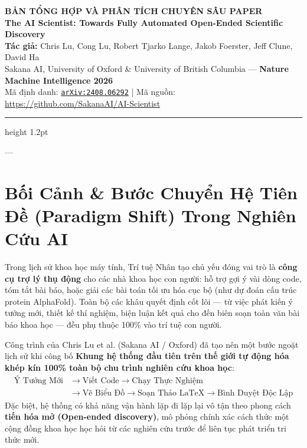 \documentclass[11pt,a4paper]{article}
\begin{document}
\begin{center}
    {\Large\bfseries BẢN TỔNG HỢP VÀ PHÂN TÍCH CHUYÊN SÂU PAPER}\\[0.3cm]
    {\LARGE\bfseries The AI Scientist: Towards Fully Automated Open-Ended Scientific Discovery}\\[0.4cm]
    {\normalsize\textbf{Tác giả:} Chris Lu, Cong Lu, Robert Tjarko Lange, Jakob Foerster, Jeff Clune, David Ha}\\[0.15cm]
    {\small Sakana AI, University of Oxford \& University of British Columbia — \textbf{Nature Machine Intelligence 2026}}\\[0.15cm]
    {\small Mã định danh: \href{https://arxiv.org/abs/2408.06292}{\texttt{arXiv:2408.06292}} \quad | \quad Mã nguồn: \url{https://github.com/SakanaAI/AI-Scientist}}
\end{center}

\vspace{0.3cm}
\hrule height 1.2pt
\vspace{0.6cm}

---

\section{Bối Cảnh \& Bước Chuyển Hệ Tiên Đề (Paradigm Shift) Trong Nghiên Cứu AI}

Trong lịch sử khoa học máy tính, Trí tuệ Nhân tạo chủ yếu đóng vai trò là \textbf{công cụ trợ lý thụ động} cho các nhà khoa học con người: hỗ trợ gợi ý vài dòng code, tóm tắt bài báo, hoặc giải các bài toán tối ưu hóa cục bộ (như dự đoán cấu trúc protein AlphaFold). Toàn bộ các khâu quyết định cốt lõi — từ việc phát kiến ý tưởng mới, thiết kế thí nghiệm, biện luận kết quả cho đến biên soạn toàn văn bài báo khoa học — đều phụ thuộc 100\% vào trí tuệ con người.

\begin{coreconceptbox}
Công trình của Chris Lu et al. (Sakana AI / Oxford) đã tạo nên một bước ngoặt lịch sử khi công bố \textbf{Khung hệ thống đầu tiên trên thế giới tự động hóa khép kín 100\% toàn bộ chu trình nghiên cứu khoa học}:
\begin{align}
    \text{Ý Tưởng Mới} &\longrightarrow \text{Viết Code} \longrightarrow \text{Chạy Thực Nghiệm} \nonumber \\
    &\longrightarrow \text{Vẽ Biểu Đồ} \longrightarrow \text{Soạn Thảo LaTeX} \longrightarrow \text{Bình Duyệt Độc Lập}
\end{align}
Đặc biệt, hệ thống có khả năng vận hành lặp đi lặp lại vô tận theo phong cách \textbf{tiến hóa mở (Open-ended discovery)}, mô phỏng chính xác cách thức một cộng đồng khoa học học hỏi từ các nghiên cứu trước để liên tục phát triển tri thức mới.
\end{coreconceptbox}
\end{document}
